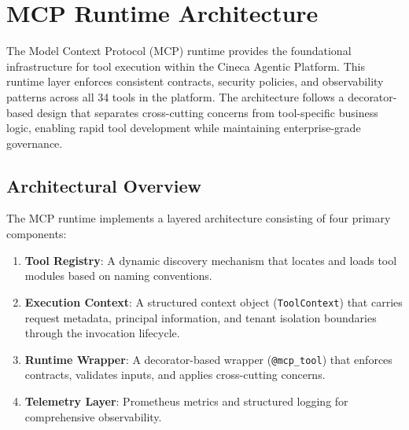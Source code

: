 
\section{MCP Runtime Architecture}
\label{sec:mcp-runtime}

The Model Context Protocol (MCP) runtime provides the foundational infrastructure for tool execution within the Cineca Agentic Platform. This runtime layer enforces consistent contracts, security policies, and observability patterns across all 34 tools in the platform. The architecture follows a decorator-based design that separates cross-cutting concerns from tool-specific business logic, enabling rapid tool development while maintaining enterprise-grade governance.

\subsection{Architectural Overview}
\label{subsec:mcp-runtime-overview}

The MCP runtime implements a layered architecture consisting of four primary components:

\begin{enumerate}
    \item \textbf{Tool Registry}: A dynamic discovery mechanism that locates and loads tool modules based on naming conventions.
    \item \textbf{Execution Context}: A structured context object (\texttt{ToolContext}) that carries request metadata, principal information, and tenant isolation boundaries through the invocation lifecycle.
    \item \textbf{Runtime Wrapper}: A decorator-based wrapper (\texttt{@mcp\_tool}) that enforces contracts, validates inputs, and applies cross-cutting concerns.
    \item \textbf{Telemetry Layer}: Prometheus metrics and structured logging for comprehensive observability.
\end{enumerate}

